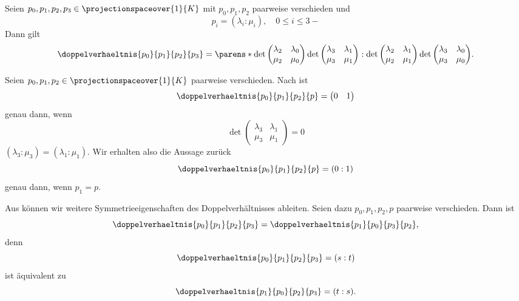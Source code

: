 \begin{lemma}\label{doppelverhaeltnis_berechnung}
  Seien \( p_0,p_1,p_2,p_3\in \projectionspaceover{1}{K} \) mit \( p_0,p_1,p_2 \) paarweise verschieden und
  \begin{equation*}
    p_i=(\lambda_i:\mu_i),\quad 0\leq i\leq 3-
  \end{equation*}
  Dann gilt
  \begin{align*}
    \doppelverhaeltnis{p_0}{p_1}{p_2}{p_3}=\parens*{\det\begin{pmatrix} \lambda_2 & \lambda_0 \\ \mu_2 & \mu_0 \end{pmatrix}\det \begin{pmatrix} \lambda_3 & \lambda_1 \\ \mu_3 & \mu_1 \end{pmatrix}:\det \begin{pmatrix} \lambda_2 & \lambda_1 \\ \mu_2 & \mu_1 \end{pmatrix}\det \begin{pmatrix} \lambda_3 & \lambda_0 \\ \mu_3 & \mu_0 \end{pmatrix}}.
  \end{align*}
\end{lemma}
\begin{beispiel*}
  Seien \( p_0,p_1,p_2\in \projectionspaceover{1}{K} \) paarweise verschieden. Nach  ist 
  \begin{equation*}
    \doppelverhaeltnis{p_0}{p_1}{p_2}{p}=\begin{pmatrix} 0 & 1 \end{pmatrix}
  \end{equation*}
  genau dann, wenn
  \begin{equation*}
    \det \begin{pmatrix} \lambda_3 & \lambda_1 \\ \mu_3 & \mu_1 \end{pmatrix}=0
  \end{equation*}
  \dh \( (\lambda_3:\mu_3)=(\lambda_1:\mu_1) \). Wir erhalten also die Aussage zurück
  \begin{equation*}
    \doppelverhaeltnis{p_0}{p_1}{p_2}{p}=(0:1)
  \end{equation*}
  genau dann, wenn \( p_1=p \).
\end{beispiel*}
\begin{bemerkung*}
  Aus  können wir  weitere Symmetrieeigenschaften des Doppelverhältnisses ableiten. Seien dazu \( p_0,p_1,p_2,p \) paarweise verschieden. Dann ist \zb
  \begin{equation*}
    \doppelverhaeltnis{p_0}{p_1}{p_2}{p_3}=\doppelverhaeltnis{p_1}{p_0}{p_3}{p_2},
  \end{equation*}
  denn
  \begin{equation*}
    \doppelverhaeltnis{p_0}{p_1}{p_2}{p_3}=(s:t)
  \end{equation*}
  ist äquivalent zu 
  \begin{equation*}
    \doppelverhaeltnis{p_1}{p_0}{p_2}{p_3}=(t:s).
  \end{equation*}
\end{bemerkung*}
